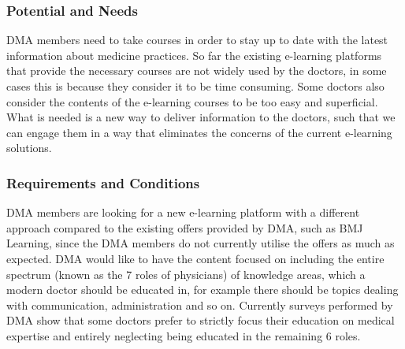 \subsubsection{Potential and Needs}
DMA members need to take courses in order to stay up to date with the latest information about medicine practices. So far the existing e-learning platforms that provide the necessary courses are not widely used by the doctors, in some cases this is because they consider it to be time consuming. Some doctors also consider the contents of the e-learning courses to be too easy and superficial. What is needed is a new way to deliver information to the doctors, such that we can engage them in a way that eliminates the concerns of the current e-learning solutions.


\subsubsection{Requirements and Conditions}
DMA members are looking for a new e-learning platform with a different approach compared to the existing offers provided by DMA, such as BMJ Learning, since the DMA members do not currently utilise the offers as much as expected. DMA would like to have the content focused on including the entire spectrum (known as the 7 roles of physicians) of knowledge areas, which a modern doctor should be educated in, for example there should be topics dealing with communication, administration and so on. Currently surveys performed by DMA show that some doctors prefer to strictly focus their education on medical expertise and entirely neglecting being educated in the remaining 6 roles.

